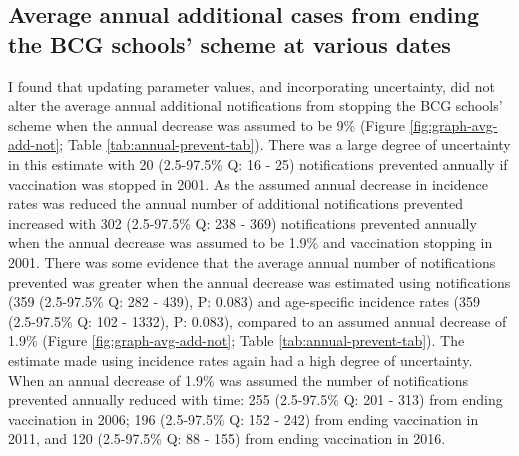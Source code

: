\documentclass[11pt,twoside]{bristolthesis}
\begin{document}
  \hypertarget{average-annual-additional-cases-from-ending-the-bcg-schools-scheme-at-various-dates}{%
  \subsection{Average annual additional cases from ending the BCG schools' scheme at various dates}\label{average-annual-additional-cases-from-ending-the-bcg-schools-scheme-at-various-dates}}
  
  I found that updating parameter values, and incorporating uncertainty, did not alter the average annual additional notifications from stopping the BCG schools' scheme when the annual decrease was assumed to be 9\% (Figure \ref{fig:graph-avg-add-not}; Table \ref{tab:annual-prevent-tab}). There was a large degree of uncertainty in this estimate with 20 (2.5-97.5\% Q: 16 - 25) notifications prevented annually if vaccination was stopped in 2001. As the assumed annual decrease in incidence rates was reduced the annual number of additional notifications prevented increased with 302 (2.5-97.5\% Q: 238 - 369) notifications prevented annually when the annual decrease was assumed to be 1.9\% and vaccination stopping in 2001. There was some evidence that the average annual number of notifications prevented was greater when the annual decrease was estimated using notifications (359 (2.5-97.5\% Q: 282 - 439), P: 0.083) and age-specific incidence rates (359 (2.5-97.5\% Q: 102 - 1332), P: 0.083), compared to an assumed annual decrease of 1.9\% (Figure \ref{fig:graph-avg-add-not}; Table \ref{tab:annual-prevent-tab}). The estimate made using incidence rates again had a high degree of uncertainty. When an annual decrease of 1.9\% was assumed the number of notifications prevented annually reduced with time: 255 (2.5-97.5\% Q: 201 - 313) from ending vaccination in 2006; 196 (2.5-97.5\% Q: 152 - 242) from ending vaccination in 2011, and 120 (2.5-97.5\% Q: 88 - 155) from ending vaccination in 2016.
\end{document}
